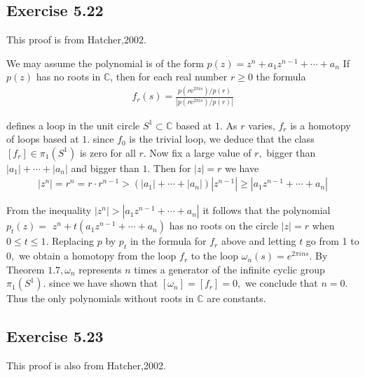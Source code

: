 \documentclass[]{ctexart}
\newcommand{\me}{\mathrm{e}}
\begin{document}
	\subsection{Exercise 5.22}
		This proof is from Hatcher,2002. 
		
		We may assume the polynomial is of the form $p(z)=z^{n}+a_{1} z^{n-1}+\cdots+a_{n}$
		If $p(z)$ has no roots in $\mathbb{C}$, then for each real number $r \geq 0$ the formula
			\begin{equation*}
			\begin{aligned}
			f_{r}(s)=\frac{p\left(r \me^{2 \pi i s}\right) / p(r)}{\left|p\left(r \me^{2 \pi i s}\right) / p(r)\right|}
			\end{aligned}
			\end{equation*}
		
		defines a loop in the unit circle $S^{1} \subset \mathbb{C}$ based at $1 .$ As $r$ varies, $f_{r}$ is a homotopy of loops based at $1 .$ since $f_{0}$ is the trivial loop, we deduce that the class $\left[f_{r}\right] \in \pi_{1}\left(S^{1}\right)$ is zero for all $r$. Now fix a large value of $r,$ bigger than $\left|a_{1}\right|+\cdots+\left|a_{n}\right|$ and bigger than $1 .$ Then for $|z|=r$ we have
			\begin{equation*}
			\begin{aligned}
			\left|z^{n}\right|=r^{n}=r \cdot r^{n-1}>\left(\left|a_{1}\right|+\cdots+\left|a_{n}\right|\right)\left|z^{n-1}\right| \geq\left|a_{1} z^{n-1}+\cdots+a_{n}\right|
			\end{aligned}
			\end{equation*}
		
		From the inequality $\left|z^{n}\right|>\left|a_{1} z^{n-1}+\cdots+a_{n}\right|$ it follows that the polynomial $p_{t}(z)=$ $z^{n}+t\left(a_{1} z^{n-1}+\cdots+a_{n}\right)$ has no roots on the circle $|z|=r$ when $0 \leq t \leq 1 .$ Replacing
		$p$ by $p_{t}$ in the formula for $f_{r}$ above and letting $t$ go from 1 to $0,$ we obtain a homotopy from the loop $f_{r}$ to the loop $\omega_{n}(s)=e^{2 \pi i n s} .$ By Theorem $1.7, \omega_{n}$ represents
		$n$ times a generator of the infinite cyclic group $\pi_{1}\left(S^{1}\right) .$ since we have shown that $\left[\omega_{n}\right]=\left[f_{r}\right]=0,$ we conclude that $n=0 .$ Thus the only polynomials without roots
		in $\mathbb{C}$ are constants.
	\subsection{Exercise 5.23}
		This proof is also from Hatcher,2002. 
		
\end{document}
